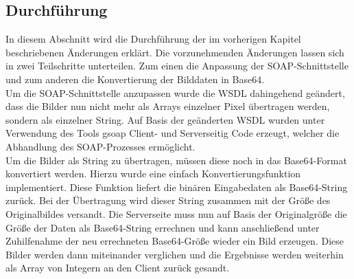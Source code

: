 \subsection{Durchf\"uhrung}
In diesem Abschnitt wird die Durchf\"uhrung der im vorherigen Kapitel beschriebenen \"Anderungen erkl\"art.
Die vorzunehmenden \"Anderungen lassen sich in zwei Teilschritte unterteilen. Zum einen die Anpassung der
SOAP-Schnittstelle und zum anderen die Konvertierung der Bilddaten in Base64.\\
Um die SOAP-Schnittstelle anzupassen wurde die WSDL dahingehend geändert, dass die Bilder nun nicht mehr als 
Arrays einzelner Pixel \"ubertragen werden, sondern als einzelner String. Auf Basis der ge\"anderten WSDL wurden
unter Verwendung des Tools gsoap Client- und Serverseitig Code erzeugt, welcher die Abhandlung des SOAP-Prozesses
erm\"oglicht.\\
Um die Bilder als String zu \"ubertragen, m\"ussen diese noch in das Base64-Format konvertiert werden. Hierzu 
wurde eine einfach Konvertierungsfunktion implementiert. Diese Funktion liefert die bin\"aren Eingabedaten als
Base64-String zur\"uck. Bei der \"Ubertragung wird dieser String zusammen mit der Gr\"o{\ss}e des Originalbildes
versandt. Die Serverseite muss nun auf Basis der Originalgr\"o{\ss}e die Gr\"o{\ss}e der Daten als Base64-String 
errechnen und kann anschlie{\ss}end unter Zuhilfenahme der neu errechneten Base64-Gr\"o{\ss}e wieder ein Bild erzeugen.
Diese Bilder werden dann miteinander verglichen und die Ergebnisse werden weiterhin als Array von Integern an den 
Client zur\"uck gesandt.
